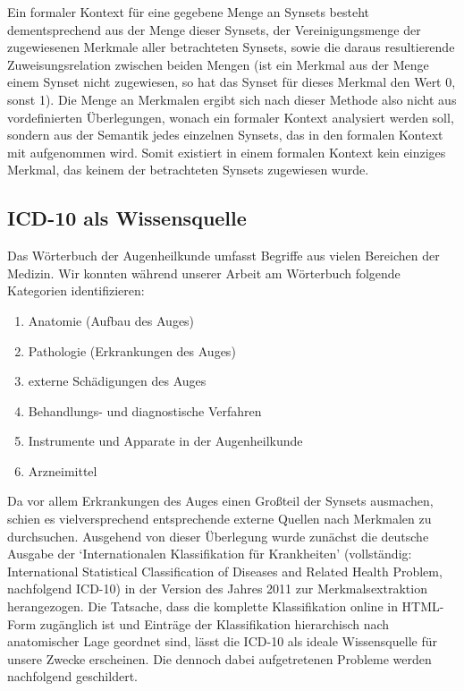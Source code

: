 \documentclass[pagesize,DIV=calc,12pt,draft]{scrreprt}
\begin{document}
Ein formaler Kontext für eine gegebene Menge an Synsets besteht
dementsprechend aus der Menge dieser Synsets, der Vereinigungsmenge der
zugewiesenen Merkmale aller betrachteten Synsets, sowie die daraus
resultierende Zuweisungsrelation zwischen beiden Mengen (ist ein Merkmal
aus der Menge einem Synset nicht zugewiesen, so hat das Synset für
dieses Merkmal den Wert 0, sonst 1). Die Menge an Merkmalen ergibt sich
nach dieser Methode also nicht aus vordefinierten Überlegungen, wonach
ein formaler Kontext analysiert werden soll, sondern aus der Semantik
jedes einzelnen Synsets, das in den formalen Kontext mit aufgenommen
wird. Somit existiert in einem formalen Kontext kein einziges Merkmal,
das keinem der betrachteten Synsets zugewiesen wurde.

\subsection{ICD-10 als Wissensquelle}

Das Wörterbuch der Augenheilkunde umfasst Begriffe aus vielen Bereichen
der Medizin. Wir konnten während unserer Arbeit am Wörterbuch folgende
Kategorien identifizieren:

\begin{enumerate}
\item
  Anatomie (Aufbau des Auges)
\item
  Pathologie (Erkrankungen des Auges)
\item
  externe Schädigungen des Auges
\item
  Behandlungs- und diagnostische Verfahren
\item
  Instrumente und Apparate in der Augenheilkunde
\item
  Arzneimittel
\end{enumerate}

Da vor allem Erkrankungen des Auges einen Großteil der Synsets
ausmachen, schien es vielversprechend entsprechende externe Quellen nach
Merkmalen zu durchsuchen. Ausgehend von dieser Überlegung wurde zunächst
die deutsche Ausgabe der `Internationalen Klassifikation für
Krankheiten' (vollständig: International Statistical Classification of
Diseases and Related Health Problem, nachfolgend ICD-10) in der Version
des Jahres 2011 zur Merkmalsextraktion herangezogen. Die Tatsache, dass
die komplette Klassifikation online in HTML-Form zugänglich ist und
Einträge der Klassifikation hierarchisch nach anatomischer Lage geordnet
sind, lässt die ICD-10 als ideale Wissensquelle für unsere Zwecke
erscheinen. Die dennoch dabei aufgetretenen Probleme werden nachfolgend
geschildert.
\end{document}
